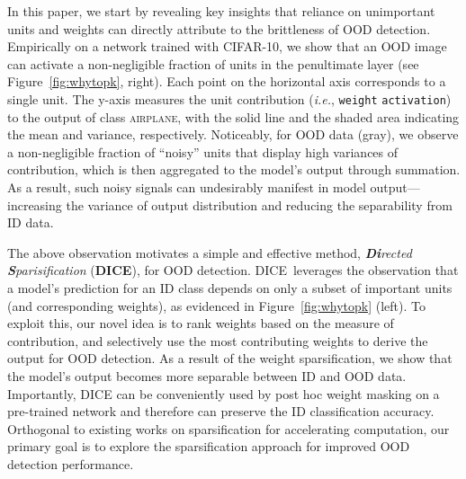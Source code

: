 \documentclass[runningheads]{llncs}
\newcommand{\methodAbbr}{DICE~}
\begin{document}
In this paper, we start by revealing key insights that reliance on unimportant units and weights can directly attribute to the brittleness of OOD detection. Empirically on a network trained with CIFAR-10, we show that an OOD image can activate a non-negligible fraction of units in the penultimate layer (see Figure~\ref{fig:whytopk}, right). Each point on the horizontal axis corresponds to a single unit. The y-axis measures the unit contribution (\emph{i.e.}, \texttt{weight}  \texttt{activation}) to the output of class \textsc{airplane}, with the solid line and the shaded area indicating the mean and variance, respectively. 
Noticeably, for OOD data (gray), we observe a non-negligible fraction of ``noisy'' units that display high variances of contribution, which is then aggregated to the model's output through summation. As a result, such noisy signals can undesirably manifest in model output---increasing the variance of output distribution and reducing the separability from ID data.

The above observation motivates a simple and effective method,
\emph{\textbf{Di}rected \textbf{S}parisification} (\textbf{DICE}), for OOD detection. \methodAbbr leverages the observation that a model's prediction for an ID class depends
on only a subset of important units (and corresponding weights), as evidenced in Figure~\ref{fig:whytopk} (left). To exploit this, our novel idea is to rank weights based on the measure of {contribution}, and selectively use the most contributing weights to derive the output for OOD detection. As a result of the weight sparsification, we show that the model's output becomes more separable between ID and OOD data.   Importantly, DICE can be conveniently used by {{post hoc} weight masking} on a pre-trained network and therefore can preserve the ID classification accuracy. 
Orthogonal to existing works on sparsification for accelerating computation, our primary goal is to explore the sparsification approach for improved  OOD detection performance.
\end{document}
